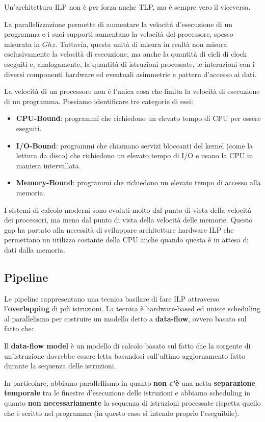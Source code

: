 \begin{remark}
    Un'architettura ILP non è per forza anche TLP, ma è sempre vero il viceversa.
\end{remark}
La parallelizzazione permette di aumentare la velocità d'esecuzione di un programma e i suoi supporti aumentano la velocità del processore, spesso misurata in $Ghz$. Tuttavia, questa unità di misura in realtà non misura esclusivamente la velocità di esecuzione, ma anche la quantità di cicli di clock eseguiti e, analogamente, la quantità di istruzioni processate, le interazioni con i diversi componenti hardware ed eventuali asimmetrie e pattern d'accesso ai dati.
\begin{remark}
    La velocità di un processore non è l'unica cosa che limita la velocità di esecuzione di un programma. Possiamo identificare tre categorie di essi:
    \begin{itemize}
        \item \textbf{CPU-Bound}: programmi che richiedono un elevato tempo di CPU per essere eseguiti.
        \item \textbf{I/O-Bound}: programmi che chiamano servizi bloccanti del kernel (come la lettura da disco) che richiedono un elevato tempo di I/O e usano la CPU in maniera intervallata.
        \item \textbf{Memory-Bound}: programmi che richiedono un elevato tempo di accesso alla memoria.
    \end{itemize}
\end{remark}
I sistemi di calcolo moderni sono evoluti molto dal punto di vista della velocità dei processori, ma meno dal punto di vista della velocità delle memorie. Questo gap ha portato alla necessità di sviluppare architetture hardware ILP che permettano un utilizzo costante della CPU anche quando questa è in attesa di dati dalla memoria.
\subsection{Pipeline}
Le pipeline rappresentano una tecnica basilare di fare ILP attraverso l'\textbf{overlapping} di più istruzioni. La tecnica è hardware-based ed unisce scheduling al parallelismo per costruire un modello detto a \textbf{data-flow}, ovvero basato sul fatto che:
\begin{definition}\label{def:dataflow}
    Il \textbf{data-flow model} è un modello di calcolo basato sul fatto che la sorgente di un'istruzione dovrebbe essere letta basandosi sull'ultimo aggiornamento fatto durante la sequenza delle istruzioni.
\end{definition}
In particolare, abbiamo parallellismo in quanto \textbf{non c'è} una netta \textbf{separazione temporale} tra le finestre d'esecuzione delle istruzioni e abbiamo scheduling in quanto \textbf{non necessariamente} la sequenza di istruzioni processate rispetta quello che è scritto nel programma (in questo caso si intendo proprio l'eseguibile).

